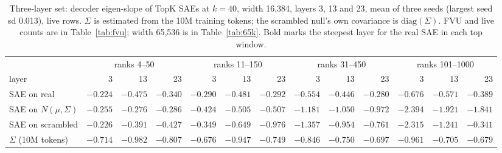 \documentclass{article}
\newcommand{\Sig}{\Sigma}
\begin{document}
\begin{table}[!htb]
\centering
\caption{Three-layer set: decoder eigen-slope of TopK SAEs at $k=40$, width 16,384, layers 3, 13 and 23, mean of three seeds (largest seed sd 0.013), live rows. $\Sig$ is estimated from the 10M training tokens; the scrambled null's own covariance is $\mathrm{diag}(\Sig)$. FVU and live counts are in Table~\ref{tab:fvu}; width 65,536 is in Table~\ref{tab:65k}. Bold marks the steepest layer for the real SAE in each top window.}
\label{tab:null}
\footnotesize
\setlength{\tabcolsep}{2.6pt}
\begin{tabular}{l rrr rrr rrr rrr}
\toprule
 & \multicolumn{3}{c}{ranks 4--50} & \multicolumn{3}{c}{ranks 11--150} & \multicolumn{3}{c}{ranks 31--450} & \multicolumn{3}{c}{ranks 101--1000} \\
\cmidrule(lr){2-4}\cmidrule(lr){5-7}\cmidrule(lr){8-10}\cmidrule(lr){11-13}
layer & 3 & 13 & 23 & 3 & 13 & 23 & 3 & 13 & 23 & 3 & 13 & 23 \\
\midrule
SAE on real & $-0.224$ & $\mathbf{-0.475}$ & $-0.340$ & $-0.290$ & $\mathbf{-0.481}$ & $-0.292$ & $-0.554$ & $-0.446$ & $-0.280$ & $-0.676$ & $-0.571$ & $-0.389$ \\
SAE on $N(\mu,\Sig)$ & $-0.255$ & $-0.276$ & $-0.286$ & $-0.424$ & $-0.505$ & $-0.507$ & $-1.181$ & $-1.050$ & $-0.972$ & $-2.394$ & $-1.921$ & $-1.841$ \\
SAE on scrambled & $-0.226$ & $-0.391$ & $-0.427$ & $-0.349$ & $-0.649$ & $-0.976$ & $-1.357$ & $-0.954$ & $-0.761$ & $-2.315$ & $-1.241$ & $-0.341$ \\
\midrule
$\Sig$ (10M tokens) & $-0.714$ & $-0.982$ & $-0.807$ & $-0.676$ & $-0.947$ & $-0.749$ & $-0.846$ & $-0.750$ & $-0.697$ & $-0.961$ & $-0.705$ & $-0.679$ \\
\bottomrule
\end{tabular}
\end{table}
\end{document}
